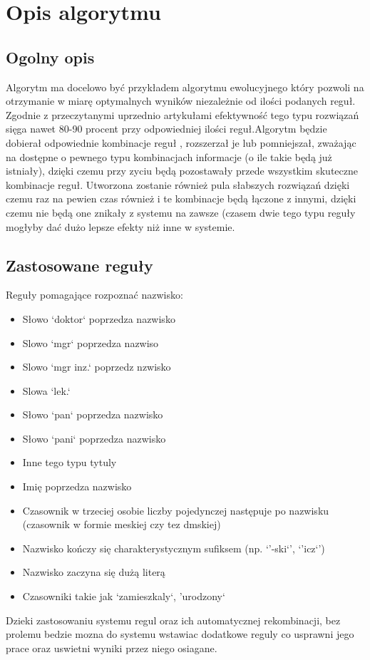 \documentclass[12pt]{article}
\begin{document}
\section{Opis algorytmu}
\subsection{Ogolny opis}
Algorytm ma docelowo być przykładem algorytmu ewolucyjnego który pozwoli na otrzymanie w miarę optymalnych wyników niezależnie od ilości podanych reguł.  Zgodnie z przeczytanymi uprzednio artykułami efektywność tego typu rozwiązań sięga nawet 80-90 procent przy odpowiedniej ilości reguł.Algorytm będzie dobierał odpowiednie kombinacje reguł , rozszerzał je lub pomniejszał, zważając na dostępne o pewnego typu kombinacjach informacje (o ile takie będą już istniały), dzięki czemu przy zyciu będą pozostawały przede wszystkim skuteczne kombinacje reguł. Utworzona zostanie również pula słabszych rozwiązań dzięki czemu raz na pewien czas również i te kombinacje będą łączone z innymi, dzięki czemu nie będą one znikały z systemu na zawsze (czasem dwie tego typu reguły mogłyby dać dużo lepsze efekty niż inne w systemie.
\subsection{Zastosowane reguły}
Reguły pomagające rozpoznać nazwisko:
\begin{itemize}
\item Słowo `doktor` poprzedza nazwisko
\item Slowo `mgr` poprzedza nazwiso
\item Slowo `mgr inz.` poprzedz nzwisko
\item Slowa `lek.`
\item Słowo `pan` poprzedza nazwisko
\item Słowo `pani` poprzedza nazwisko
\item Inne tego typu tytuly
\item Imię poprzedza nazwisko
\item Czasownik w trzeciej osobie liczby pojedynczej następuje po nazwisku (czasownik w formie meskiej czy tez dmskiej)
\item Nazwisko kończy się charakterystycznym sufiksem (np. `'-ski`', `'icz`')
\item Nazwisko zaczyna się dużą literą
\item Czasowniki takie jak `zamieszkaly`, 'urodzony`
\end{itemize}
Dzieki zastosowaniu systemu regul oraz ich automatycznej rekombinacji, bez prolemu bedzie mozna do systemu wstawiac dodatkowe reguly co usprawni jego prace oraz uswietni wyniki przez niego osiagane.
\end{document}
